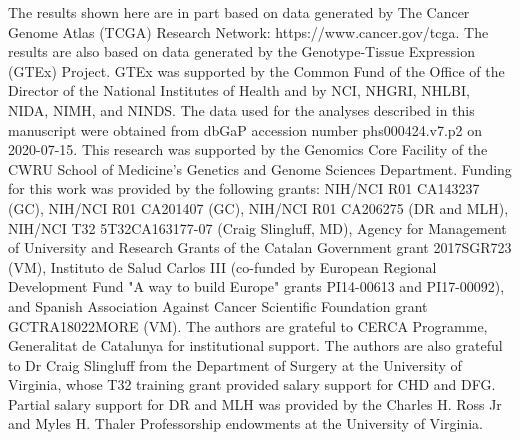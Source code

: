 The results shown here are in part based on data generated by The Cancer Genome Atlas (TCGA) Research Network: https://www.cancer.gov/tcga.
The results are also based on data generated by the Genotype-Tissue Expression (GTEx) Project.
GTEx was supported by the Common Fund of the Office of the Director of the National Institutes of Health and by NCI, NHGRI, NHLBI, NIDA, NIMH, and NINDS.
The data used for the analyses described in this manuscript were obtained from dbGaP accession number phs000424.v7.p2 on 2020-07-15.
This research was supported by the Genomics Core Facility of the CWRU School of Medicine's Genetics and Genome Sciences Department.
Funding for this work was provided by the following grants: NIH/NCI R01 CA143237 (GC), NIH/NCI R01 CA201407 (GC), NIH/NCI R01 CA206275 (DR and MLH), NIH/NCI T32 5T32CA163177-07 (Craig Slingluff, MD), Agency for Management of University and Research Grants of the Catalan Government grant 2017SGR723 (VM), Instituto de Salud Carlos III (co-funded by European Regional Development Fund "A way to build Europe" grants PI14-00613 and PI17-00092), and Spanish Association Against Cancer Scientific Foundation grant GCTRA18022MORE (VM).
The authors are grateful to CERCA Programme, Generalitat de Catalunya for institutional support.
The authors are also grateful to Dr Craig Slingluff from the Department of Surgery at the University of Virginia, whose T32 training grant provided salary support for CHD and DFG.
Partial salary support for DR and MLH was provided by the Charles H. Ross Jr and Myles H. Thaler Professorship endowments at the University of Virginia.
